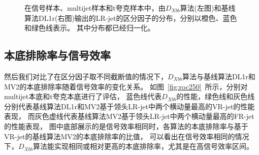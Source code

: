 \begin{figure}[!thbp]
\begin{subfigure}{.5\textwidth}
  \caption{}
  \label{fig:XbbPerf3DL1r}
  \end{subfigure}
  \caption{
  在信号样本、multijet样本和t夸克样本中，由$D_{Xbb}$算法(左图)和基线算法DL1r(右图)输出的LR-jet的区分因子的分布，分别以橙色、蓝色和绿色线表示。
  其中分布都已经归一化。
 }
\label{fig:XbbPerf3}
\end{figure}


\subsection{本底排除率与信号效率}
\label{sec:XbbPerf4}


然后我们对比了在区分因子取不同截断值的情况下，$D_{Xbb}$算法与基线算法DL1r和MV2的本底排除率随着信号效率的变化关系。
如图~\ref{fig:roc250}~所示，分别对multijet本底和t夸克本底进行了评估，
蓝色线代表$D_{Xbb}$的性能，绿色线和灰色线分别代表基线算法DL1r和MV2基于领头LR-jet中两个横动量最高的VR-jet的性能表现，
而灰色虚线代表基线算法MV2基于领头LR-jet中两个横动量最高的FR-jet的性能表现，
图中底部展示的是信号效率相同时，各算法的本底排除率与基于VR-jet的基线算法MV2的本底排除率的比值，
可以看出在信号效率相同的情况下，$D_{Xbb}$算法能实现相同或相对更高的本底排除率，尤其是在高信号效率区间。

